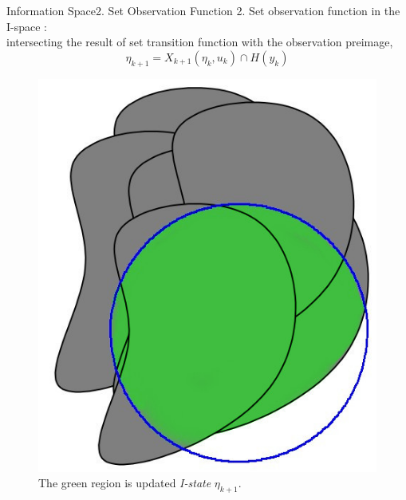 \begin{frame}{Information Space}{2. Set Observation Function}
  2. Set observation function in the I-space : \\
  intersecting the result of set transition function with the observation preimage,
  \begin{equation}
    \label{eq:settrans}
    \eta_{k+1} =   X_{k+1}(\eta_{k}, u_k) \cap H(y_{k})
  \end{equation}
  
   \begin{figure}
     \centering
     \includegraphics[scale=0.2]{figs/xk_intersect.jpg}
     \caption{\scriptsize{The green region is updated \emph{I-state} $\eta_{k+1}$.}}
   \end{figure}
 \end{frame}



